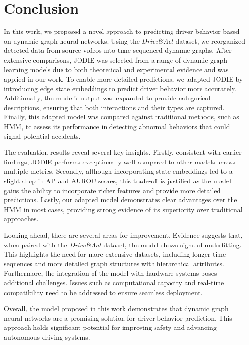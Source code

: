 \chapter{Conclusion}\label{chapter:conclusion}

In this work, we proposed a novel approach to predicting driver behavior based on dynamic graph neural networks. Using the \textit{Drive\&Act} dataset, we reorganized detected data from source videos into time-sequenced dynamic graphs. After extensive comparisons, JODIE was selected from a range of dynamic graph learning models due to both theoretical and experimental evidence and was applied in our work. To enable more detailed predictions, we adapted JODIE by introducing edge state embeddings to predict driver behavior more accurately. Additionally, the model’s output was expanded to provide categorical descriptions, ensuring that both interactions and their types are captured. Finally, this adapted model was compared against traditional methods, such as HMM, to assess its performance in detecting abnormal behaviors that could signal potential accidents.

The evaluation results reveal several key insights. Firstly, consistent with earlier findings, JODIE performs exceptionally well compared to other models across multiple metrics. Secondly, although incorporating state embeddings led to a slight drop in AP and AUROC scores, this trade-off is justified as the model gains the ability to incorporate richer features and provide more detailed predictions. Lastly, our adapted model demonstrates clear advantages over the HMM in most cases, providing strong evidence of its superiority over traditional approaches.

Looking ahead, there are several areas for improvement. Evidence suggests that, when paired with the \textit{Drive\&Act} dataset, the model shows signs of underfitting. This highlights the need for more extensive datasets, including longer time sequences and more detailed graph structures with hierarchical attributes. Furthermore, the integration of the model with hardware systems poses additional challenges. Issues such as computational capacity and real-time compatibility need to be addressed to ensure seamless deployment.

Overall, the model proposed in this work demonstrates that dynamic graph neural networks are a promising solution for driver behavior prediction. This approach holds significant potential for improving safety and advancing autonomous driving systems.

